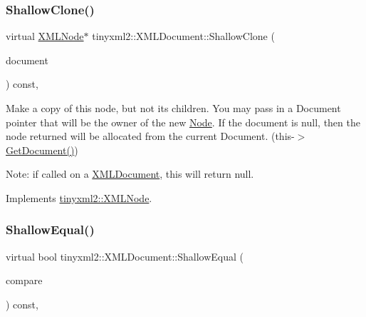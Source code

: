 \mbox{\label{classtinyxml2_1_1XMLDocument_aa37cc1709d7e1e988bc17dcfb24a69b8}} 
\subsubsection{\texorpdfstring{Shallow\+Clone()}{ShallowClone()}\hspace{0.1cm}{\footnotesize\ttfamily [2/2]}}
{\footnotesize\ttfamily virtual \hyperlink{classtinyxml2_1_1XMLNode}{X\+M\+L\+Node}$\ast$ tinyxml2\+::\+X\+M\+L\+Document\+::\+Shallow\+Clone (\begin{DoxyParamCaption}\item[{\hyperlink{classtinyxml2_1_1XMLDocument}{X\+M\+L\+Document} $\ast$}]{document }\end{DoxyParamCaption}) const\hspace{0.3cm}{\ttfamily [inline]}, {\ttfamily [virtual]}}

Make a copy of this node, but not its children. You may pass in a Document pointer that will be the owner of the new \hyperlink{classNode}{Node}. If the \textquotesingle{}document\textquotesingle{} is null, then the node returned will be allocated from the current Document. (this-\/$>$\hyperlink{classtinyxml2_1_1XMLNode_af343d1ef0b45c0020e62d784d7e67a68}{Get\+Document()})

Note\+: if called on a \hyperlink{classtinyxml2_1_1XMLDocument}{X\+M\+L\+Document}, this will return null. 

Implements \hyperlink{classtinyxml2_1_1XMLNode_a8402cbd3129d20e9e6024bbcc0531283}{tinyxml2\+::\+X\+M\+L\+Node}.

\mbox{\label{classtinyxml2_1_1XMLDocument_a6fe5ef18699091844fcf64b56ffa5bf9}} 
\subsubsection{\texorpdfstring{Shallow\+Equal()}{ShallowEqual()}\hspace{0.1cm}{\footnotesize\ttfamily [1/2]}}
{\footnotesize\ttfamily virtual bool tinyxml2\+::\+X\+M\+L\+Document\+::\+Shallow\+Equal (\begin{DoxyParamCaption}\item[{const \hyperlink{classtinyxml2_1_1XMLNode}{X\+M\+L\+Node} $\ast$}]{compare }\end{DoxyParamCaption}) const\hspace{0.3cm}{\ttfamily [inline]}, {\ttfamily [virtual]}}

